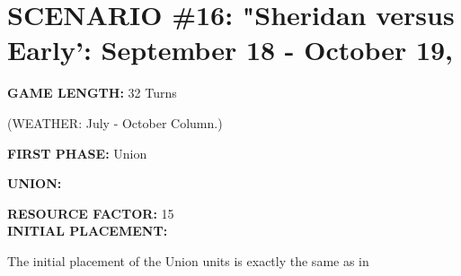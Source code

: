 \section{SCENARIO \#16: "Sheridan versus Early': September 18 - October 19,
}


\begin{scenariodata}
\textbf{GAME LENGTH:} 32 Turns\\
\end{scenariodata}

\begin{scenariodata}
(WEATHER: July - October Column.)\\
\end{scenariodata}

\begin{scenariodata}
\textbf{FIRST PHASE:} Union\\
\end{scenariodata}

\begin{scenariodata}
\textbf{UNION:}\\
\end{scenariodata}

\begin{scenariodata}
\textbf{RESOURCE FACTOR:} 15\\
\textbf{INITIAL PLACEMENT:}\\
\end{scenariodata}

The initial placement of the Union units is exactly the same as in


